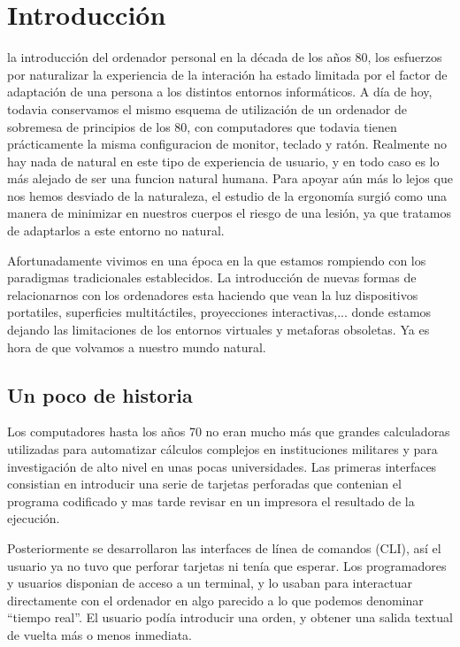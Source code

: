 \chapter{Introducción}
 la introducción del ordenador personal en la década de los años 80, los esfuerzos por naturalizar la experiencia de la interación ha estado limitada por el factor de adaptación de una persona a los distintos entornos informáticos. A día de hoy, todavia conservamos el mismo esquema de utilización de un ordenador de sobremesa de principios de los 80, con computadores que todavia tienen prácticamente la misma configuracion de monitor, teclado y ratón. Realmente no hay nada de natural en este tipo de experiencia de usuario, y en todo caso es lo más alejado de ser una funcion natural humana. Para apoyar aún más lo lejos que nos hemos desviado de la naturaleza, el estudio de la ergonomía surgió como una manera de minimizar en nuestros cuerpos el riesgo de una lesión, ya que tratamos de adaptarlos a este entorno no natural.

Afortunadamente vivimos en una época en la que estamos rompiendo con los paradigmas tradicionales establecidos. La introducción de nuevas formas de relacionarnos con los ordenadores esta haciendo que vean la luz dispositivos portatiles, superficies multitáctiles, proyecciones interactivas,... donde estamos dejando las limitaciones de los entornos virtuales y metaforas obsoletas. Ya es hora de que volvamos a nuestro mundo natural.

\section{Un poco de historia}
Los computadores hasta los años 70 no eran mucho más que grandes calculadoras utilizadas para automatizar cálculos complejos en instituciones militares y para investigación de alto nivel en unas pocas universidades. Las primeras interfaces consistian en introducir una serie de tarjetas perforadas que contenian el programa codificado y mas tarde revisar en un impresora el resultado de la ejecución.

Posteriormente se desarrollaron las interfaces de línea de comandos (CLI), así el usuario ya no tuvo que perforar tarjetas ni tenía que esperar. Los programadores y usuarios disponian de acceso a un terminal, y lo usaban para interactuar directamente con el ordenador en algo parecido a lo que podemos denominar ``tiempo real''. El usuario podía introducir una orden, y obtener una salida textual de vuelta más o menos inmediata.

